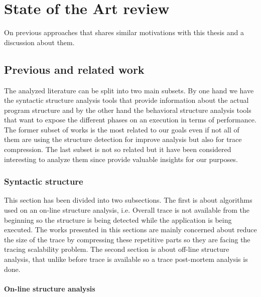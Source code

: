 \chapter{State of the Art review}

On previous approaches that shares similar motivations with this thesis and a
discussion about them. 

\section{Previous and related work}\label{related_work}

The analyzed literature can be split into two main subsets. By one hand we have 
the syntactic structure analysis tools that provide information about the actual 
program structure and by the other hand the behavioral structure analysis tools
that want to expose the different phases on an execution in terms of performance. 
The former subset of works is the most related to our goals even if not all of
them are using the structure detection for improve analysis but also for
trace compression. The last subset is not so related but it have been considered
interesting to analyze them since provide valuable insights for our purposes.

\subsection{Syntactic structure}\label{ss:syntactic_structure}

This section has been divided into two subsections. The first is about
algorithms used on an on-line structure analysis, i.e. Overall trace is not 
available from the beginning so the structure is being detected while the
application is being executed. The works presented in this sections are 
mainly concerned about reduce the size of the trace by compressing these
repetitive parts so they are facing the tracing scalability problem. The second 
section is about off-line structure analysis, that unlike before trace is 
available so a trace post-mortem analysis is done.
 
\subsubsection{On-line structure analysis}


